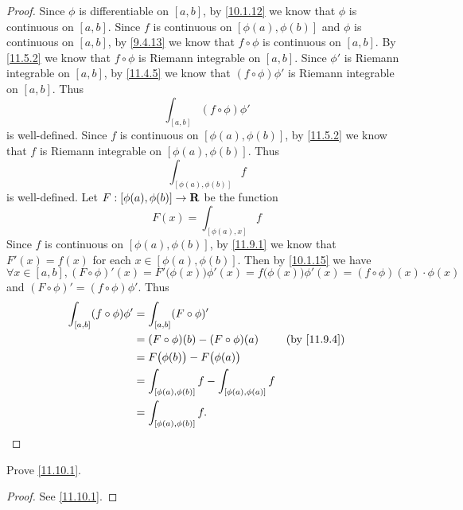 \begin{proof}
  Since \(\phi\) is differentiable on \([a, b]\), by \cref{10.1.12} we know that \(\phi\) is continuous on \([a, b]\).
  Since \(f\) is continuous on \([\phi(a), \phi(b)]\) and \(\phi\) is continuous on \([a, b]\), by \cref{9.4.13} we know that \(f \circ \phi\) is continuous on \([a, b]\).
  By \cref{11.5.2} we know that \(f \circ \phi\) is Riemann integrable on \([a, b]\).
  Since \(\phi'\) is Riemann integrable on \([a, b]\), by \cref{11.4.5} we know that \((f \circ \phi) \phi'\) is Riemann integrable on \([a, b]\).
  Thus
  \[
    \int_{[a, b]} (f \circ \phi) \phi'
  \]
  is well-defined.
  Since \(f\) is continuous on \([\phi(a), \phi(b)]\), by \cref{11.5.2} we know that \(f\) is Riemann integrable on \([\phi(a), \phi(b)]\).
  Thus
  \[
    \int_{[\phi(a), \phi(b)]} f
  \]
  is well-defined.
  Let \(F : [\phi(a), \phi(b)] \to \mathbf{R}\) be the function
  \[
    F(x) = \int_{[\phi(a), x]} f
  \]
  Since \(f\) is continuous on \([\phi(a), \phi(b)]\), by \cref{11.9.1} we know that \(F'(x) = f(x)\) for each \(x \in [\phi(a), \phi(b)]\).
  Then by \cref{10.1.15} we have
  \[
    \forall x \in [a, b], (F \circ \phi)'(x) = F'\big(\phi(x)\big) \phi'(x) = f\big(\phi(x)\big) \phi'(x) = (f \circ \phi)(x) \cdot \phi(x)
  \]
  and \((F \circ \phi)' = (f \circ \phi) \phi'\).
  Thus
  \begin{align*}
    \int_{[a, b]} (f \circ \phi) \phi' & = \int_{[a, b]} (F \circ \phi)'                                                         \\
                                       & = (F \circ \phi)(b) - (F \circ \phi)(a)                     & \text{(by \cref{11.9.4})} \\
                                       & = F\big(\phi(b)\big) - F\big(\phi(a)\big)                                               \\
                                       & = \int_{[\phi(a), \phi(b)]} f - \int_{[\phi(a), \phi(a)]} f                             \\
                                       & = \int_{[\phi(a), \phi(b)]} f.
  \end{align*}
\end{proof}

\exercisesection

\begin{exercise}\label{ex 11.10.1}
  Prove \cref{11.10.1}.
\end{exercise}

\begin{proof}
  See \cref{11.10.1}.
\end{proof}

